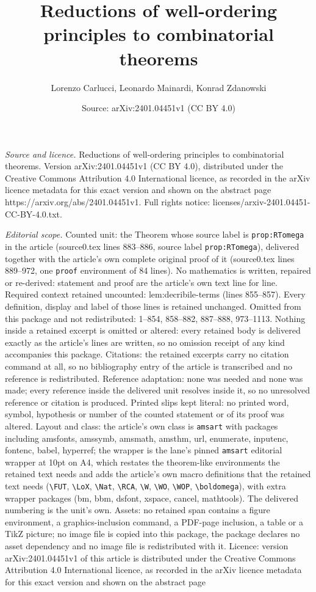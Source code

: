 \documentclass[10pt,a4paper]{amsart}
\title[Reductions of well-ordering principles to combinatorial theo]{Reductions of well-ordering principles to combinatorial theorems}
\author{Lorenzo Carlucci, Leonardo Mainardi, Konrad Zdanowski}
\date{Source: arXiv:2401.04451v1 (CC BY 4.0)}
\begin{document}
\maketitle

\noindent\emph{Source and licence.} Reductions of well-ordering principles to combinatorial theorems. Version arXiv:2401.04451v1 (CC BY 4.0), distributed under the Creative Commons Attribution 4.0 International licence, as recorded in the arXiv licence metadata for this exact version and shown on the abstract page https://arxiv.org/abs/2401.04451v1. Full rights notice: licenses/arxiv-2401.04451-CC-BY-4.0.txt.\par\smallskip

\noindent\textit{Editorial scope.} Counted unit: the Theorem whose source label is \texttt{prop:RTomega} in the article (source0.tex lines 883--886, source label \texttt{prop:RTomega}), delivered together with the article's own complete original proof of it (source0.tex lines 889--972, one \texttt{proof} environment of 84 lines). No mathematics is written, repaired or re-derived: statement and proof are the article's own text line for line. Required context retained uncounted: lem:decribile-terms (lines 855--857). Every definition, display and label of those lines is retained unchanged. Omitted from this package and not redistributed: 1--854, 858--882, 887--888, 973--1113. Nothing inside a retained excerpt is omitted or altered: every retained body is delivered exactly as the article's lines are written, so no omission receipt of any kind accompanies this package. Citations: the retained excerpts carry no citation command at all, so no bibliography entry of the article is transcribed and no reference is redistributed. Reference adaptation: none was needed and none was made; every reference inside the delivered unit resolves inside it, so no unresolved reference or citation is produced. Printed slips kept literal: no printed word, symbol, hypothesis or number of the counted statement or of its proof was altered. Layout and class: the article's own class is \texttt{amsart} with packages including amsfonts, amssymb, amsmath, amsthm, url, enumerate, inputenc, fontenc, babel, hyperref; the wrapper is the lane's pinned \texttt{amsart} editorial wrapper at 10pt on A4, which restates the theorem-like environments the retained text needs and adds the article's own macro definitions that the retained text needs (\texttt{\textbackslash FUT}, \texttt{\textbackslash LoX}, \texttt{\textbackslash Nat}, \texttt{\textbackslash RCA}, \texttt{\textbackslash W}, \texttt{\textbackslash WO}, \texttt{\textbackslash WOP}, \texttt{\textbackslash boldomega}), with extra wrapper packages (bm, bbm, dsfont, xspace, cancel, mathtools). The delivered numbering is the unit's own. Assets: no retained span contains a figure environment, a graphics-inclusion command, a PDF-page inclusion, a table or a TikZ picture; no image file is copied into this package, the package declares no asset dependency and no image file is redistributed with it. Licence: version arXiv:2401.04451v1 of this article is distributed under the Creative Commons Attribution 4.0 International licence, as recorded in the arXiv licence metadata for this exact version and shown on the abstract page 
\end{document}
